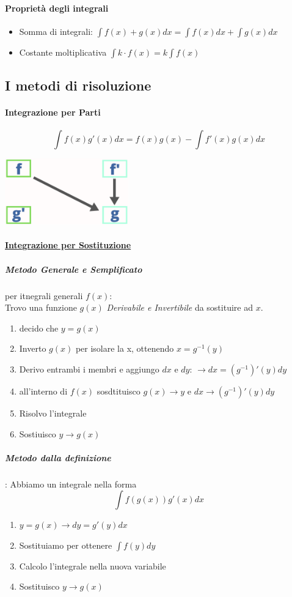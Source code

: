 \documentclass[12pt, a4paper]{article}
\begin{document}
\paragraph*{Proprietà degli integrali}
\begin{itemize}
	\item Somma di integrali: $\int f(x)+g(x) dx = \int f(x) dx + \int g(x) dx$
	\item Costante moltiplicativa $\int k \cdot f(x) = k \int f(x)$
\end{itemize}
\subsection*{I metodi di risoluzione}
\paragraph*{Integrazione per Parti}
$$\int f(x)g'(x)dx = f(x)g(x)-\int f'(x)g(x)dx$$
\begin{center}
	\includegraphics[width=0.4\textwidth]{integrazione-per-parti.png}
\end{center}

\paragraph*{\underline{Integrazione per Sostituzione}}
\subparagraph*{\emph{Metodo Generale e Semplificato}} per itnegrali generali $f(x)$:
\\Trovo una funzione $g(x)$ \emph{Derivabile e Invertibile} da sostituire ad $x$.
\begin{enumerate}
	\item decido che $y=g(x)$
	\item Inverto $g(x)$ per isolare la x, ottenendo $x=g^{-1}(y)$
	\item Derivo entrambi i membri e aggiungo $dx$ e $dy$: $\to dx=(g^{-1})'(y)dy$
	\item all'interno di $f(x)$ sosdtituisco $g(x) \to y$ e $dx \to (g^{-1})'(y)dy$
	\item Risolvo l'integrale
	\item Sostiuisco $y \to g(x)$
\end{enumerate}
\subparagraph*{Metodo dalla definizione}: Abbiamo un integrale nella forma
$$\int f(g(x))g'(x) dx$$
\begin{enumerate}
	\item $y=g(x)\to dy=g'(y)dx$
	\item Sostituiamo per ottenere $\int f(y)dy$
	\item Calcolo l'integrale nella nuova variabile
	\item Sostituisco $y\to g(x)$
\end{enumerate}
\end{document}
